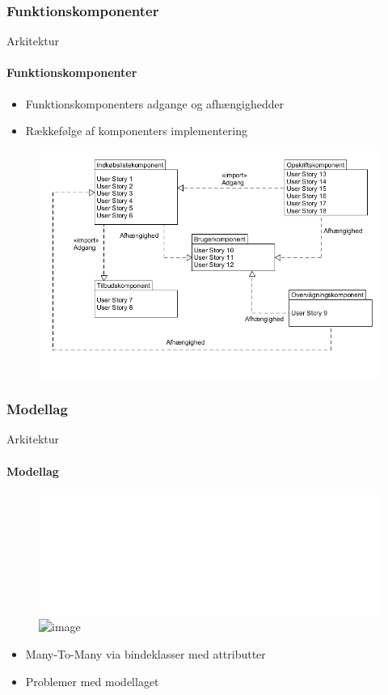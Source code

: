 		\subsubsection{Funktionskomponenter}
		\begin{frame}[t]{Arkitektur}\framesubtitle{Funktionskomponenter}
			\begin{itemize}
				\item Funktionskomponenters adgange og afhængighedder
				\item Rækkefølge af komponenters implementering
			\end{itemize}
			\vspace{-5pt}
			\begin{figure}[h!]
				\centering
				\includegraphics[width=1\textwidth]{images/Komponenter.png} %
			\end{figure}
		\end{frame}

		\subsubsection{Modellag}
			\begin{frame}[t]{Arkitektur}\framesubtitle{Modellag}
				\begin{figure}
					
					\includegraphics<1-2>[trim=8.2cm 16.5cm 0.5cm 6.3cm, clip, width=1\textwidth]{images/PF_Model_UML_Simple.pdf} %
					\includegraphics<3>[width=0.5\textwidth]{images/UML_Pref_med_felter.png} %

				\end{figure}
				\begin{itemize}
					\item<2> Many-To-Many via bindeklasser med attributter
					\item<3> Problemer med modellaget
				\end{itemize}
			\end{frame}

